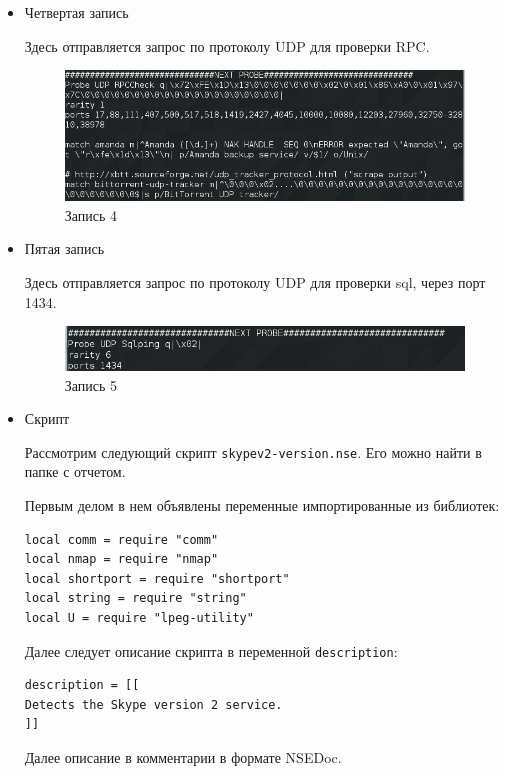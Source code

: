 \documentclass[11pt, a4paper]{article}		%
\begin{document}
\begin{itemize}
\item Четвертая запись

Здесь отправляется запрос по протоколу UDP для проверки RPC.

\begin{figure}[h!]
\centering
\includegraphics[scale=0.8]{res/14}
\caption{Запись 4}
\end{figure}

\item Пятая запись

Здесь отправляется запрос по протоколу UDP для проверки sql, через порт 1434.


\begin{figure}[h!]
\centering
\includegraphics[scale=0.8]{res/15}
\caption{Запись 5}
\end{figure}




\item Скрипт

Рассмотрим следующий скрипт \verb'skypev2-version.nse'. Его можно найти в папке с отчетом.

Первым делом в нем объявлены переменные импортированные из библиотек:

\begin{verbatim}
local comm = require "comm"
local nmap = require "nmap"
local shortport = require "shortport"
local string = require "string"
local U = require "lpeg-utility"
\end{verbatim}

Далее следует описание скрипта в переменной \verb'description':

\begin{verbatim}
description = [[
Detects the Skype version 2 service.
]]
\end{verbatim}

Далее описание в комментарии в формате NSEDoc.


\end{itemize}
\end{document}
